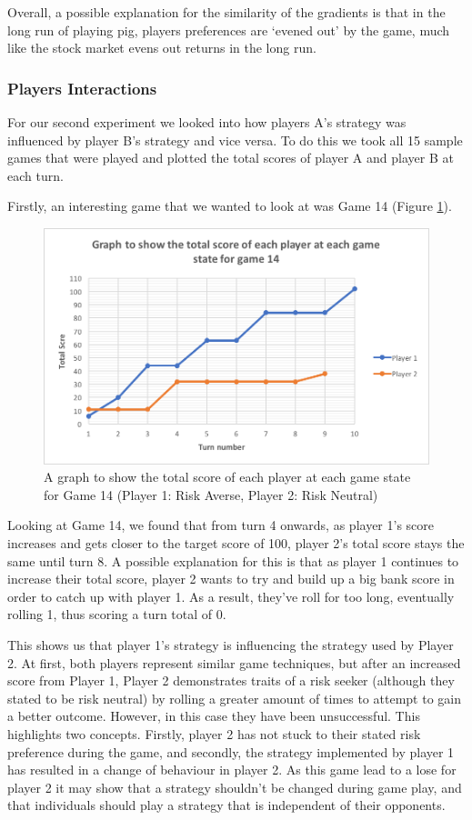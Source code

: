 \documentclass[a4paper,titlepage]{article}
\begin{document}
Overall, a possible explanation for the similarity of the gradients is that in the long run of playing pig, players preferences are ‘evened out’ by the game, much like the stock market evens out returns in the long run.
\subsubsection{Players Interactions}
For our second experiment we looked into how players A's strategy was influenced by player B's strategy and vice versa. To do this we took all 15 sample games that were played and plotted the total scores of player A and player B at each turn.

Firstly, an interesting game that we wanted to look at was Game 14 (Figure \ref{figure13}).


\begin{figure}
\includegraphics[scale=1]{game14}
\caption{A graph to show the total score of each player at each game state for Game 14 (Player 1: Risk Averse, Player 2: Risk Neutral)\label{figure13}}
\end{figure}
Looking at Game 14, we found that from turn 4 onwards, as player 1’s score increases and gets closer to the target score of 100, player 2’s total score stays the same until turn 8. A possible explanation for this is that as player 1 continues to increase their total score, player 2 wants to try and build up a big bank score in order to catch up with player 1. As a result, they've roll for too long, eventually rolling 1, thus scoring a turn total of 0.

This shows us that player 1's strategy is influencing the strategy used by Player 2. At first, both players represent similar game techniques, but after an increased score from Player 1, Player 2 demonstrates traits of a risk seeker (although they stated to be risk neutral) by rolling a greater amount of times to attempt to gain a better outcome. However, in this case they have been unsuccessful. This highlights two concepts. Firstly, player 2 has not stuck to their stated risk preference during the game, and secondly, the strategy implemented by player 1 has resulted in a change of behaviour in player 2. As this game lead to a lose for player 2 it may show that a strategy shouldn’t be changed during game play, and that individuals should play a strategy that is independent of their opponents.
\end{document}
